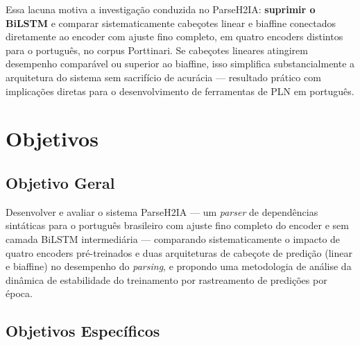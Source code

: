 Essa lacuna motiva a investigação conduzida no ParseH2IA: \textbf{suprimir o BiLSTM} e
comparar sistematicamente cabeçotes linear e biaffine conectados diretamente ao encoder com
ajuste fino completo, em quatro encoders distintos para o português, no corpus Porttinari.
Se cabeçotes lineares atingirem desempenho comparável ou superior ao biaffine, isso simplifica
substancialmente a arquitetura do sistema sem sacrifício de acurácia — resultado prático com
implicações diretas para o desenvolvimento de ferramentas de PLN em português.

\section{Objetivos}
\label{sec:objetivos}

\subsection*{Objetivo Geral}

Desenvolver e avaliar o sistema ParseH2IA — um \textit{parser} de dependências sintáticas para
o português brasileiro com ajuste fino completo do encoder e sem camada BiLSTM intermediária —
comparando sistematicamente o impacto de quatro encoders pré-treinados e duas arquiteturas de
cabeçote de predição (linear e biaffine) no desempenho do \textit{parsing}, e propondo uma
metodologia de análise da dinâmica de estabilidade do treinamento por rastreamento de
predições por época.

\subsection*{Objetivos Específicos}


